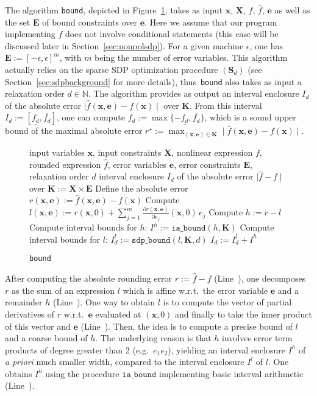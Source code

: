 \documentclass[preprint]{sigplanconf}
\newcommand{\code}[1]{\lstinline{#1}}
\newcommand{\N}{\mathbb{N}}
\newcommand{\x}{\mathbf{x}}
\newcommand{\e}{\mathbf{e}}
\def\S{\mathbf{S}}
\def\E{\mathbf{E}}
\def\K{\mathbf{K}}
\def\S{\mathbf{S}}
\def\X{\mathbf{X}}
\newcommand{\iaboundfun}[2]{\mathtt{ia\_bound}(#1, #2)}
\newcommand{\iabound}{\mathtt{ia\_bound}}
\newcommand{\sdpboundfun}[3]{\mathtt{sdp\_bound}(#1, #2, #3)}
\theoremstyle{plain}
\begin{document}
The algorithm \code{bound}, depicted in Figure~\ref{alg:bound}, takes as input $\x$, $\X$, $f$, $\hat{f}$, $\e$ as well as the set $\E$ of bound constraints over $\e$. Here we assume that our program implementing $f$ does not involve conditional statements (this case will be discussed later in Section~\ref{sec:nonpolsdp}). For a given machine $\epsilon$, one has $\E := [-\epsilon, \epsilon]^m$, with $m$ being the number of error variables. This algorithm actually relies on the sparse SDP optimization procedure $(\S_d)$ (see Section~\ref{sec:sdpbackground} for more details), thus~\code{bound} also takes as input a relaxation order $d \in \N$. The algorithm provides as output an interval enclosure $I_d$ of the absolute error $\mid \hat{f}(\x,\e) - f(\x) \mid$ over $\K$. 
From this interval $I_d:= [\underline{f_d}, \overline{f_d}]$, one can compute $f_d := \max \{- \underline{f_d}, \overline{f_d} \}$, which is a sound upper bound of the maximal absolute error $r^\star := \max_{(\x,\e)\in \K} \mid \hat{f}(\x,\e) - f(\x) \mid $.

\begin{figure}[!ht]
\begin{algorithmic}[1]                    
\Require input variables $\x$, input constraints $\X$, nonlinear expression $f$, rounded expression $\hat{f}$, error variables $\e$, error constraints $\E$, relaxation order $d$
\Ensure interval enclosure $I_d$ of the absolute error $\mid \hat{f} - f  \mid$ over $\K := \X \times \E$
\State Define the absolute error $r(\x, \e) := \hat{f}(\x,\e) - f(\x)$ \label{line:r}
\State Compute $l(\x,\e) := r(\x, 0) + \sum_{j=1}^m \frac{\partial r(\x,\e)} {\partial e_j} (\x,0) \, e_j$ \label{line:l}
\State Compute $h := r - l$ \label{line:h}
\State Compute interval bounds for $h$: $I^h := \iaboundfun{h}{\K}$ \label{line:iabound}
\State Compute interval bounds for $l$: $I_d^l := \sdpboundfun{l}{\K}{d}$  \label{line:sdpbound}
\State \Return $I_d := I_d^l + I^h$ 
\end{algorithmic}
\caption{\code{bound}}
\label{alg:bound}
\end{figure}

After computing the absolute rounding error $r := \hat{f} - f$ (Line~), one decomposes $r$ as the sum of an expression $l$ which is affine w.r.t.~the error variable $\e$ and a remainder $h$ (Line~). One way to obtain $l$ is to compute the vector of partial derivatives of $r$ w.r.t.~$\e$ evaluated at $(\x, 0)$ and finally to take the inner product of this vector and $\e$ (Line~). Then, the idea is to compute a precise bound of $l$ and a coarse bound of $h$. The underlying reason is that $h$ involves error term products of degree greater than 2 (e.g.~$e_1 e_2$), yielding an interval enclosure $I^h$ of \textit{a priori} much smaller width, compared to the interval enclosure $I^l$ of $l$. One obtains $I^h$ using the procedure $\iabound$ implementing basic interval arithmetic (Line~). 
%
\end{document}
